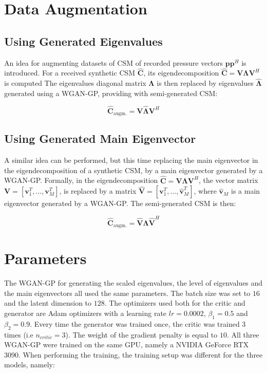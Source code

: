 \documentclass[11pt,a4paper,twoside]{report}
\begin{document}
\section{Data Augmentation}

\subsection{Using Generated Eigenvalues}

An idea for augmenting datasets of CSM of recorded pressure vectors $\mathbf{p} \mathbf{p}^H$ is introduced. For a received synthetic CSM $\mathbf{\hat{C}}$, its  eigendecomposition $\mathbf{\hat{C}} = \mathbf{V} \mathbf{\Lambda} \mathbf{V}^H$ is computed The eigenvalues diagonal matrix $ \mathbf{\Lambda}$ is then replaced by eigenvalues $\hat{\mathbf{\Lambda}}$ generated using a WGAN-GP, providing with semi-generated CSM:

\begin{equation}
    \mathbf{\hat{C}}_\text{augm.}  = \mathbf{V} \hat{\mathbf{\Lambda}} \mathbf{V}^H
\end{equation}

\subsection{Using Generated Main Eigenvector}

A similar idea can be performed, but this time replacing the main eigenvector in the eigendecomposition of a synthetic CSM, by a main eigenvector generated by a WGAN-GP. Formally, in the eigendecomposition $\mathbf{\hat{C}} = \mathbf{V} \mathbf{\Lambda} \mathbf{V}^H$, the vector matrix $\mathbf{V} = [\mathbf{v}_1^T, \dots, \mathbf{v}_M^T]$, is replaced by a matrix $\hat{\mathbf{V}} = [\mathbf{v}_1^T, \dots, \hat{\mathbf{v}}_M^T]$, where $\hat{\mathbf{v}}_M$ is a main eigenvector generated by a WGAN-GP. The semi-generated CSM is then:

\begin{equation}
    \mathbf{\hat{C}}_\text{augm.}  = \hat{\mathbf{V}} \mathbf{\Lambda} \hat{\mathbf{V}}^H
\end{equation}



\section{Parameters}

The WGAN-GP for generating the scaled eigenvalues, the level of eigenvalues and the main eigenvectors all used the same parameters. The batch size was set to $16$ and the latent dimension to $128$. The optimizers used both for the critic and generator are Adam optimizers with a learning rate $lr=0.0002$, $\beta_1=0.5$ and $\beta_2=0.9$. Every time the generator was trained once, the critic was trained 3 times (i.e $n_{critic} = 3$). The weight of the gradient penalty is equal to $10$. All three WGAN-GP were trained on the same GPU, namely a NVIDIA GeForce RTX 3090. When performing the training, the training setup was different for the three models, namely:
\end{document}
